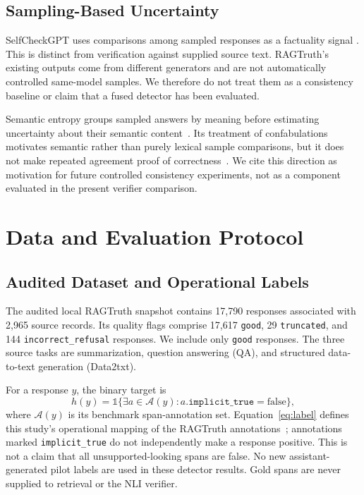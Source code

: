 \documentclass[conference,a4paper]{IEEEtran}
\begin{document}
\subsection{Sampling-Based Uncertainty}
SelfCheckGPT uses comparisons among sampled responses as a factuality signal \cite{selfcheck}. This is distinct from verification against supplied source text. RAGTruth's existing outputs come from different generators and are not automatically controlled same-model samples. We therefore do not treat them as a consistency baseline or claim that a fused detector has been evaluated.

Semantic entropy groups sampled answers by meaning before estimating uncertainty about their semantic content~\cite{semanticentropy}.
Its treatment of confabulations motivates semantic rather than purely lexical sample comparisons, but it does not make repeated agreement proof of correctness~\cite{semanticentropy}.
We cite this direction as motivation for future controlled consistency experiments, not as a component evaluated in the present verifier comparison.

\section{Data and Evaluation Protocol}
\subsection{Audited Dataset and Operational Labels}
The audited local RAGTruth snapshot contains 17,790 responses associated with 2,965 source records. Its quality flags comprise 17,617 \texttt{good}, 29 \texttt{truncated}, and 144 \texttt{incorrect\_refusal} responses. We include only \texttt{good} responses. The three source tasks are summarization, question answering (QA), and structured data-to-text generation (Data2txt).

For a response $y$, the binary target is
\begin{equation}
h(y)=\mathbb{1}\{\exists a\in\mathcal{A}(y):a.\texttt{implicit\_true}=\mathrm{false}\},\label{eq:label}
\end{equation}
where $\mathcal{A}(y)$ is its benchmark span-annotation set. Equation~\eqref{eq:label} defines this study's operational mapping of the RAGTruth annotations~\cite{ragtruth}; annotations marked \texttt{implicit\_true} do not independently make a response positive. This is not a claim that all unsupported-looking spans are false. No new assistant-generated pilot labels are used in these detector results. Gold spans are never supplied to retrieval or the NLI verifier.
\end{document}
